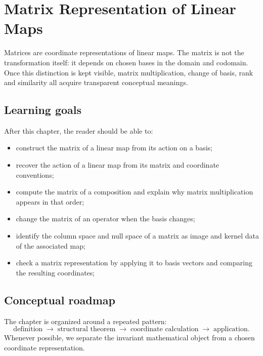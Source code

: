 \chapter{Matrix Representation of Linear Maps}
\label{ch:i07-matrix-representation-of-linear-maps}

Matrices are coordinate representations of linear maps. The matrix is not the transformation itself: it depends on chosen bases in the domain and codomain. Once this distinction is kept visible, matrix multiplication, change of basis, rank and similarity all acquire transparent conceptual meanings.

\section*{Learning goals}
After this chapter, the reader should be able to:
\begin{itemize}
\item construct the matrix of a linear map from its action on a basis;
\item recover the action of a linear map from its matrix and coordinate conventions;
\item compute the matrix of a composition and explain why matrix multiplication appears in that order;
\item change the matrix of an operator when the basis changes;
\item identify the column space and null space of a matrix as image and kernel data of the associated map;
\item check a matrix representation by applying it to basis vectors and comparing the resulting coordinates;
\end{itemize}
\section*{Conceptual roadmap}
The chapter is organized around a repeated pattern:
\[
\boxed{\text{definition}\;\longrightarrow\;\text{structural theorem}\;\longrightarrow\;\text{coordinate calculation}\;\longrightarrow\;\text{application}.}
\]
Whenever possible, we separate the invariant mathematical object from a chosen coordinate representation.


